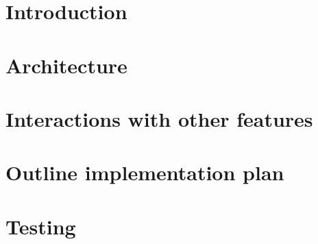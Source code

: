 



\maketitle

\tableofcontents

\chapter{Introduction}



\chapter{Architecture}













\chapter{Interactions with other features}



\chapter{Outline implementation plan}



\chapter{Testing}



\printbibliography[heading=bibintoc]

\appendix





